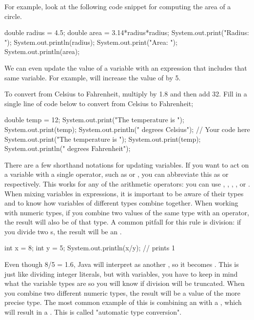 For example, look at the following code snippet for computing the area of a circle.	
\begin{code}	
  double radius = 4.5;	
  double area = 3.14*radius*radius;	
  System.out.print("Radius: ");	
  System.out.println(radius);	
  System.out.print("Area: ");	
  System.out.println(area);	
\end{code}	
We can even update the value of a variable with an expression that includes that same variable. For example,  will increase the value of  by 5.	
\begin{example}	
  To convert from Celsius to Fahrenheit, multiply by 1.8 and then add 32. Fill in a single line of code below to convert  from Celsius to Fahrenheit;	
  \begin{code}	
    double temp = 12;	
    System.out.print("The temperature is ");	
    System.out.print(temp);	
    System.out.println(" degrees Celsius");	
    // Your code here	
    System.out.print("The temperature is ");	
    System.out.print(temp);	
    System.out.println(" degrees Fahrenheit");	
  \end{code}	
\end{example}	
There are a few shorthand notations for updating variables. If you want to act on a variable  with a single operator, such as  or , you can abbreviate this as  or  respectively. This works for any of the arithmetic operators: you can use \ic{+=}, \ic{-=}, \ic{*=}, \ic{/=}, or \ic{\%=}.	
When mixing variables in expressions, it is important to be aware of their types and to know how variables of different types combine together. When working with numeric types, if you combine two values of the same type with an operator, the result will also be of that type. A common pitfall for this rule is division: if you divide two s, the result will be an .	
\begin{code}	
  int x = 8;	
  int y = 5;	
  System.out.println(x/y); // prints 1	
\end{code}	
Even though 8/5 = 1.6, Java will interpret  as another , so it becomes . This is just like dividing integer literals, but with variables, you have to keep in mind what the variable types are so you will know if division will be truncated.	
When you combine two different numeric types, the result will be a value of the more precise type. The most common example of this is combining an  with a , which will result in a . This is called "automatic type conversion".

